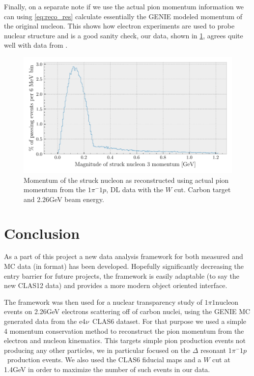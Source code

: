 \documentclass[a4paper,12pt]{article}
\newcommand{\efn}{e4$\nu$}
\newcommand{\verbb}[1]{\text{\Verb|#1|}}
\newcommand{\md}{$1\pi^-1p$}
\begin{document}
Finally, on a separate note if we use the actual pion momentum information we can using \cref{eq:reco_res} calculate essentially the GENIE modeled momentum of the original nucleon.
This shows how electron experiments are used to probe nuclear structure and is a good sanity check, our data, shown in \cref{fig:nuc_str1}, agrees quite well with data from \cite{luMeasurementNuclearEffects2016a}.

\begin{figure}[H]
    \centering
    \includegraphics{figures/python/nuc_str1.pdf}
    \caption{
        Momentum of the struck nucleon as reconstructed using actual pion momentum from the \md, DL data with the $W$ cut.
        Carbon target and 2.26\si{GeV} beam energy.
    }\label{fig:nuc_str1}
\end{figure}

\section{Conclusion}
As a part of this project a new data analysis framework for both measured and MC data (in \verbb{gst} format) has been developed.
Hopefully significantly decreasing the entry barrier for future projects, the framework is easily adaptable (to say the new CLAS12 data) and provides a more modern object oriented interface.

The framework was then used for a nuclear transparency study of $1\pi1\text{nucleon}$ events on 2.26\si{GeV} electrons scattering off of carbon nuclei, using the GENIE MC generated data from the \efn\ CLAS6 dataset.
For that purpose we used a simple 4 momentum conservation method to reconstruct the pion momentum from the electron and nucleon kinematics.
This targets simple pion production events not producing any other particles, we in particular focused on the $\Delta$ resonant \md\ production events.
We also used the CLAS6 fiducial maps and a $W$ cut at 1.4\si{GeV} in order to maximize the number of such events in our data.
\end{document}
